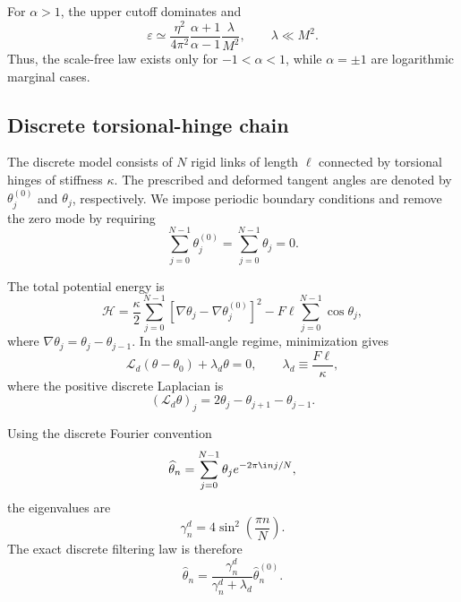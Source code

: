\documentclass[pdflatex, twocolumn, sn-nature]{sn-jnl}
\begin{document}
For $\alpha>1$, the upper cutoff dominates and
\begin{equation}
\varepsilon
\simeq
\frac{\eta^2}{4\pi^2}
\frac{\alpha+1}{\alpha-1}
\frac{\lambda}{M^2},
\qquad
\lambda\ll M^2.
\end{equation}
Thus, the scale-free law exists only for $-1<\alpha<1$, while $\alpha=\pm1$ are logarithmic marginal cases.

\subsection*{Discrete torsional-hinge chain}
\label{sec:discrete_methods}

The discrete model consists of $N$ rigid links of length $\ell$ connected by torsional hinges of stiffness $\kappa$. The prescribed and deformed tangent angles are denoted by $\theta_j^{(0)}$ and $\theta_j$, respectively. We impose periodic boundary conditions and remove the zero mode by requiring
\begin{equation}
\sum_{j=0}^{N-1}\theta_j^{(0)}
=
\sum_{j=0}^{N-1}\theta_j
=
0.
\end{equation}

The total potential energy is
\begin{equation}
\mathcal H
=
\frac{\kappa}{2}
\sum_{j=0}^{N-1}
\left[
\nabla\theta_j-\nabla\theta_j^{(0)}
\right]^2
-
F\ell
\sum_{j=0}^{N-1}
\cos\theta_j,
\label{eq:discrete_energy_methods}
\end{equation}
where $\nabla\theta_j=\theta_j-\theta_{j-1}$. In the small-angle regime, minimization gives
\begin{equation}
\mathcal L_d
\left(
\theta-\theta_0
\right)
+
\lambda_d\theta
=
0,
\qquad
\lambda_d
\equiv
\frac{F\ell}{\kappa},
\label{eq:discrete_eq_methods}
\end{equation}
where the positive discrete Laplacian is
\begin{equation}
(\mathcal L_d\theta)_j
=
2\theta_j-\theta_{j+1}-\theta_{j-1}.
\label{eq:positive_discrete_laplacian}
\end{equation}

Using the discrete Fourier convention
\begin{equation}
\widehat{\theta}_n
=
\sum_{j=0}^{N-1}
\theta_j
e^{-2\pi \i n j/N},
\end{equation}
the eigenvalues are
\begin{equation}
\gamma_n^d
=
4\sin^2\left(\frac{\pi n}{N}\right).
\label{eq:discrete_eigenvalues_methods}
\end{equation}
The exact discrete filtering law is therefore
\begin{equation}
\widehat{\theta}_n
=
\frac{\gamma_n^d}
{\gamma_n^d+\lambda_d}
\widehat{\theta}_n^{(0)}.
\label{eq:discrete_filter_methods}
\end{equation}
\end{document}
